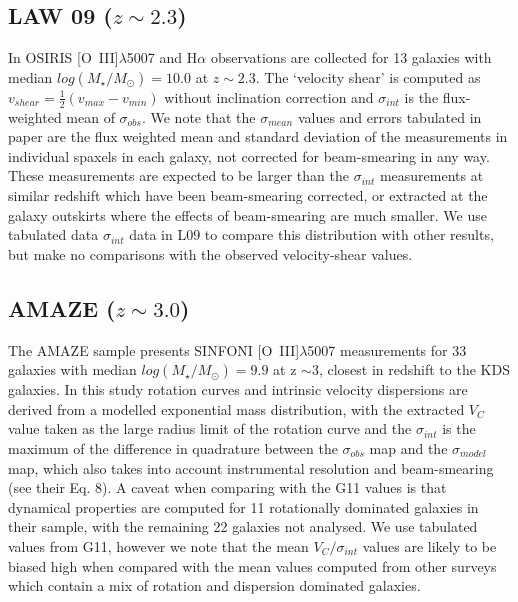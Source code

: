 \documentclass[fleqn,usenatbib]{mn2e}
\begin{document}
\subsection{LAW 09 ($z\sim2.3$)}\label{subsec:law_09}
In \cite[L09]{Law2009} OSIRIS [O~{\sc III}]$\lambda$5007 and H$\alpha$ observations are collected for 13 galaxies with median $log(M_{\star}/M_{\odot})=10.0$ at $z\sim2.3$.
The `velocity shear' is computed as $v_{shear} = \frac{1}{2}(v_{max} - v_{min})$ without inclination correction and $\sigma_{int}$ is the flux-weighted mean of $\sigma_{obs}$.
We note that the $\sigma_{mean}$ values and errors tabulated in \cite{Law2009} paper are the flux weighted mean and standard deviation of the measurements in individual spaxels in each galaxy, not corrected for beam-smearing in any way.
These measurements are expected to be larger than the $\sigma_{int}$ measurements at similar redshift which have been beam-smearing corrected, or extracted at the galaxy outskirts where the effects of beam-smearing are much smaller.
We use tabulated data $\sigma_{int}$ data in L09 to compare this distribution with other results, but make no comparisons with the observed velocity-shear values.

\subsection{AMAZE ($z\sim3.0$)}\label{subsec:AMAZE}
The AMAZE sample \cite[G11]{Gnerucci2011} presents SINFONI [O~{\sc III}]$\lambda$5007 measurements for 33 galaxies with median $log(M_{\star}/M_{\odot})=9.9$ at z $\sim 3$, closest in redshift to the KDS galaxies.
In this study rotation curves and intrinsic velocity dispersions are derived from a modelled exponential mass distribution, with the extracted $V_{C}$ value taken as the large radius limit of the rotation curve and the $\sigma_{int}$ is the maximum of the difference in quadrature between the $\sigma_{obs}$ map and the $\sigma_{model}$ map, which also takes into account instrumental resolution and beam-smearing (see their Eq. 8).
A caveat when comparing with the G11 values is that dynamical properties are computed for 11 rotationally dominated galaxies in their sample, with the remaining 22 galaxies not analysed.
We use tabulated values from G11, however we note that the mean $V_{C}/\sigma_{int}$ values are likely to be biased high when compared with the mean values computed from other surveys which contain a mix of rotation and dispersion dominated galaxies. \\
\end{document}
